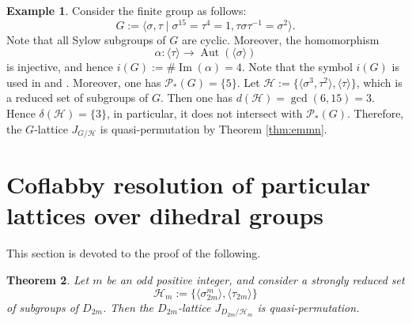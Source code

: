 \documentclass[12pt]{amsart}
\theoremstyle{plain}
\newtheorem{thm}{Theorem}[section]
\theoremstyle{definition}
\newtheorem{ex}[thm]{Example}
\numberwithin{thm}{section}
\numberwithin{equation}{section}
\newcommand{\cH}{\mathcal{H}}
\DeclareMathOperator{\Ima}{Im}
\DeclareMathOperator{\Aut}{Aut}
\begin{document}
\begin{ex}
Consider the finite group as follows: 
\begin{equation*}
G:=\langle \sigma,\tau \mid \sigma^{15}=\tau^{4}=1,\tau \sigma \tau^{-1}=\sigma^{2}\rangle. 
\end{equation*}
Note that all Sylow subgroups of $G$ are cyclic. Moreover, the homomorphism
\begin{equation*}
\alpha \colon \langle \tau \rangle \rightarrow \Aut(\langle \sigma \rangle)
\end{equation*}
is injective, and hence $i(G):=\#\Ima(\alpha)=4$. Note that the symbol $i(G)$ is used in \cite{Endo1975} and \cite{Endo2011}. Moreover, one has $\mathscr{P}_{*}(G)=\{5\}$. Let $\cH:=\{\langle \sigma^{3},\tau^{2}\rangle,\langle \tau \rangle\}$, which is a reduced set of subgroups of $G$. Then one has $d(\cH)=\gcd(6,15)=3$. Hence $\delta(\cH)=\{3\}$, in particular, it does not intersect with $\mathscr{P}_{*}(G)$. Therefore, the $G$-lattice $J_{G/\cH}$ is quasi-permutation by Theorem \ref{thm:emmn}. 
\end{ex}

\section{Coflabby resolution of particular lattices over dihedral groups}\label{sect:cflb}

This section is devoted to the proof of the following. 

\begin{thm}\label{thm:nzf2}
Let $m$ be an odd positive integer, and consider a strongly reduced set 
\begin{equation*}
\cH_{m}:=\{\langle \sigma_{2m}^{m}\rangle, \langle \tau_{2m} \rangle \}
\end{equation*}
of subgroups of $D_{2m}$. Then the $D_{2m}$-lattice $J_{D_{2m}/\cH_{m}}$ is quasi-permutation. 
\end{thm}
\end{document}

